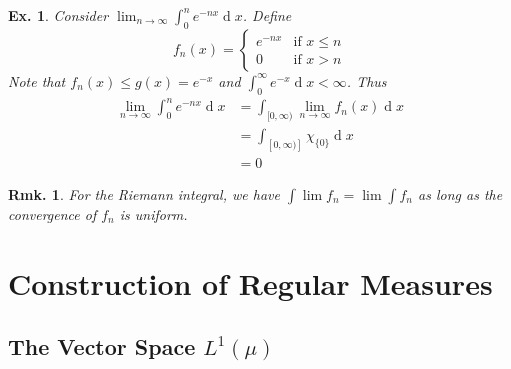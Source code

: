 \documentclass[12pt, a4paper]{book}
\renewcommand{\d}[1]{\ensuremath{\operatorname{d}\!{#1}}} %
\newtheorem{remark}[theorem]{Rmk.}
\newtheorem{example}[theorem]{Ex.}
\theoremstyle{nonumberplain}
\begin{document}
\begin{example}
    Consider $\lim_{n\to\infty}\int_0^n e^{-nx}\d{x}$.
    Define
    \[f_n(x)=
        \begin{cases}
            e^{-nx}&\text{if }x\leq n\\
            0 &\text{if }x>n
        \end{cases}
    \]
    Note that $f_n(x)\leq g(x)=e^{-x}$ and $\int_0^\infty e^{-x}\d{x}<\infty$.
    Thus
    \begin{align*}
        \lim_{n\to\infty}\int_0^n e^{-nx}\d{x} &= \int_{[0,\infty)}\lim_{n\to\infty}f_n(x)\d{x}\\
                                               &= \int_{[0,\infty)]}\chi_{\{0\}}\d{x}\\
                                               &= 0
    \end{align*}
\end{example}
\begin{remark}
    For the Riemann integral, we have $\int\lim f_n=\lim\int f_n$ as long as the convergence of $f_n$ is uniform.
\end{remark}
\chapter{Construction of Regular Measures}
\section{The Vector Space $L^1(\mu)$}
\end{document}
